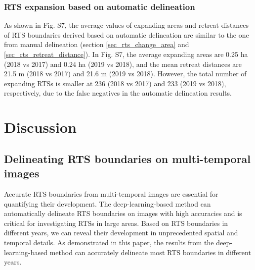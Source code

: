 \documentclass[authoryear,preprint,review,12pt]{elsarticle}
\begin{document}
 


\subsubsection{RTS expansion based on automatic delineation}
\label{sec_rts_change_auto_mapping}

As shown in Fig. S7, the average values of expanding areas and retreat distances of RTS boundaries derived based on automatic delineation are similar to the one from manual delineation (section \ref{sec_rts_change_area} and \ref{sec_rts_retreat_distance}).
In Fig. S7, the average expanding areas are 0.25 ha (2018 vs 2017) and 0.24 ha (2019 vs 2018), and the mean retreat distances are 21.5 m (2018 vs 2017)  and 21.6 m (2019 vs 2018). 
However, the total number of expanding RTSs is smaller at 236 (2018 vs 2017) and 233 (2019 vs 2018), respectively, due to the false negatives in the automatic delineation results.

 

\section{Discussion}
\label{sec_discussion}

\subsection{Delineating RTS boundaries on multi-temporal images}
\label{sec_diss_mapping_rts_multi_images}

Accurate RTS boundaries from multi-temporal images are essential for quantifying their development.
The deep-learning-based method can automatically delineate RTS boundaries on images with high accuracies and is critical for investigating RTSs in large areas. 
Based on RTS boundaries in different years, we can reveal their development in unprecedented spatial and temporal details. 
As demonstrated in this paper, the results from the deep-learning-based method can accurately delineate most RTS boundaries in different years. %
\end{document}
